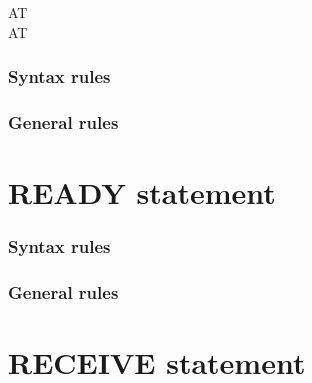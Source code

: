 \begin{syntax}
\begin{0-1}
    \begin{1+}
      AT  \imperativestatement \\
       AT  \imperativestatement
    \end{1+}
  \end{0-1}

  \begin{0-1}
  \end{0-1}
\end{syntax}

\subsubsection{Syntax rules}

\subsubsection{General rules}

\section{READY statement}

\begin{syntax}[\miscextcolour]
   
\end{syntax}

\subsubsection{Syntax rules}

\subsubsection{General rules}

\section{RECEIVE statement}

\begin{syntax}[\deletedcolour]


\end{syntax}

